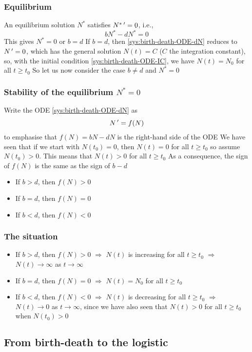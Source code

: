 \documentclass[aspectratio=169]{beamer}
\begin{document}
\begin{frame}\frametitle{Equilibrium}
An equilibrium solution $N^*$ satisfies $N^*\,'=0$, i.e.,
\[
bN^*-dN^*=0
\]
\vfill
This gives $N^*=0$ or $b=d$
\vfill 
If $b=d$, then \eqref{sys:birth-death-ODE-dN} reduces to $N\,'=0$, which has the general solution $N(t)=C$ ($C$ the integration constant), so, with the initial condition \eqref{sys:birth-death-ODE-IC}, we have $N(t)=N_0$ for all $t\geq t_0$
\vfill
So let us now consider the case $b\neq d$ and $N^*=0$
\end{frame}

\begin{frame}\frametitle{Stability of the equilibrium $N^*=0$}
Write the ODE \eqref{sys:birth-death-ODE-dN} as
\[
N\,'=f(N)
\]
to emphasise that $f(N)=bN-dN$ is the right-hand side of the ODE
\vfill
We have seen that if we start with $N(t_0)=0$, then $N(t)=0$ for all $t\geq t_0$ so assume $N(t_0)>0$. This means that $N(t)>0$ for all $t\geq t_0$
\vfill
As a consequence, the sign of $f(N)$ is the same as the sign of $b-d$
\begin{itemize}
\item If $b>d$, then $f(N)>0$
\item If $b=d$, then $f(N)=0$
\item If $b<d$, then $f(N)<0$
\end{itemize}
\end{frame}


\begin{frame}\frametitle{The situation}
\begin{itemize}
\item If $b>d$, then $f(N)>0$ $\Rightarrow$ $N(t)$ is increasing for all $t\geq t_0$ $\Rightarrow$ $N(t)\to\infty$ as $t\to\infty$
\vfill
\item If $b=d$, then $f(N)=0$ $\Rightarrow$ $N(t)=N_0$ for all $t\geq t_0$
\vfill
\item If $b<d$, then $f(N)<0$ $\Rightarrow$ $N(t)$ is decreasing for all $t\geq t_0$ $\Rightarrow$ $N(t)\to 0$ as $t\to\infty$, since we have also seen that $N(t)>0$ for all $t\geq t_0$ when $N(t_0)>0$
\end{itemize}
\end{frame}


\subsection{From birth-death to the logistic}
\end{document}
